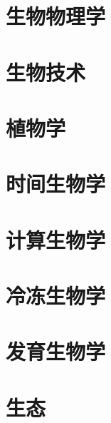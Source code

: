 \documentclass[UTF8]{../NatureUniverse}
\begin{document}
\section{生物物理学}
\section{生物技术}
\section{植物学}

\section{时间生物学}
\section{计算生物学}
\section{冷冻生物学}
\section{发育生物学}
\section{生态}
\end{document}
